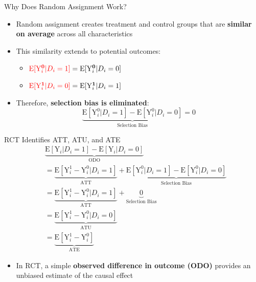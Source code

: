 \documentclass[hyperref={pdfpagelabels=false}]{beamer}
\begin{document}
	\begin{frame}{Why Does Random Assignment Work?}
		\begin{itemize}
			\item Random assignment creates treatment and control groups that are \textbf{similar on average} across all characteristics
			\vspace{0.2cm}
			\item This similarity extends to potential outcomes:
			\vspace{0.1cm}
			\begin{itemize}
				\item $\textcolor{red}{\mathrm{E}[\mathrm{Y}^{\mathbf{0}}_{i}|D_i=1]} = \mathrm{E}[\mathrm{Y}^{\mathbf{0}}_{i}|D_i=0]$
				\vspace{0.2cm}
				\item $\textcolor{red}{\mathrm{E}[\mathrm{Y}^{\mathbf{1}}_{i}|D_i=0]} = \mathrm{E}[\mathrm{Y}^{\mathbf{1}}_{i}|D_i=1]$
			\end{itemize}
			\vspace{0.3cm}
			\item Therefore, \textbf{selection bias is eliminated}:
			\begin{equation*}
				\underbrace{\mathrm{E}[\mathrm{Y}^{0}_{i}|D_i=1]-\mathrm{E}[\mathrm{Y}^{0}_{i}|D_i=0]}_{\text{Selection Bias}} = 0
			\end{equation*}
		\end{itemize}
	\end{frame}
	
	\begin{frame}{RCT Identifies ATT, ATU, and ATE}
		\begin{equation*}
			\begin{aligned}
				& \underbrace{\mathrm{E}[\mathrm{Y}_{i}|D_i=1] - \mathrm{E}[\mathrm{Y}_{i}|D_i=0]}_{\text{ODO}} \\
				&= \underbrace{\mathrm{E}[\mathrm{Y}^{1}_{i}-\mathrm{Y}^{0}_{i}|D_i=1]}_{\text{ATT}} + \underbrace{\mathrm{E}[\mathrm{Y}^{0}_{i}|D_i=1]-\mathrm{E}[\mathrm{Y}^{0}_{i}|D_i=0]}_{\text{Selection Bias}} \\
				&= \underbrace{\mathrm{E}[\mathrm{Y}^{1}_{i}-\mathrm{Y}^{0}_{i}|D_i=1]}_{\text{ATT}} + \underbrace{0}_{\text{Selection Bias}} \\
				&= \underbrace{\mathrm{E}[\mathrm{Y}^{1}_{i}-\mathrm{Y}^{0}_{i}|D_i=0]}_{\text{ATU}} \\
				&= \underbrace{\mathrm{E}[\mathrm{Y}^{1}_{i}-\mathrm{Y}^{0}_{i}]}_{\text{ATE}}
			\end{aligned}
		\end{equation*}
		\vspace{0.1cm}
		\begin{itemize}
			\item In RCT, a simple \textbf{observed difference in outcome (ODO)} provides an unbiased estimate of the causal effect
		\end{itemize}
	\end{frame}
	
\end{document}
